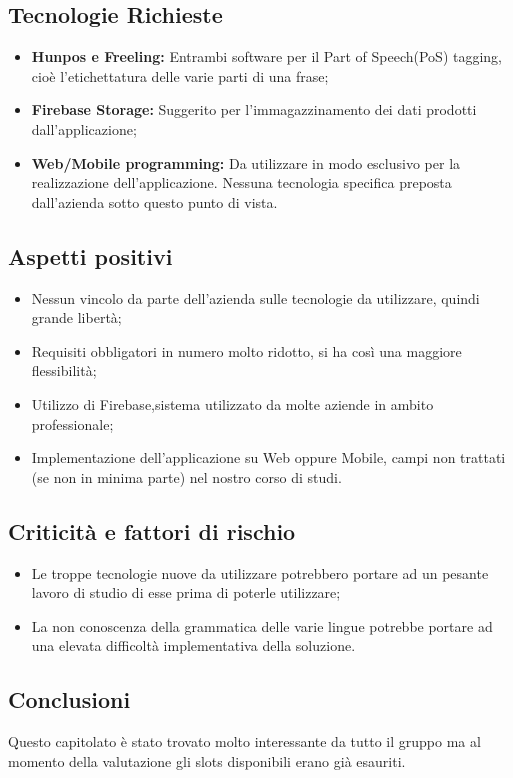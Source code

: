 \subsection{Tecnologie Richieste}
\begin{itemize}
	\item \textbf{Hunpos e Freeling: } Entrambi software per il Part of Speech(PoS) tagging, cioè l'etichettatura delle varie parti di una frase;
	\item \textbf{Firebase Storage: }Suggerito per l'immagazzinamento dei dati prodotti dall'applicazione;
	\item \textbf{Web/Mobile programming: }Da utilizzare in modo esclusivo per la realizzazione dell'applicazione. Nessuna tecnologia specifica preposta dall'azienda sotto questo punto di vista.
\end{itemize}
\subsection{Aspetti positivi}
\begin{itemize}
	\item Nessun vincolo da parte dell'azienda sulle tecnologie da utilizzare, quindi grande libertà;
	\item Requisiti obbligatori in numero molto ridotto, si ha così una maggiore flessibilità;
	\item Utilizzo di Firebase,sistema utilizzato da molte aziende in ambito professionale;
	\item Implementazione dell'applicazione su Web oppure Mobile, campi non trattati (se non in minima parte) nel nostro corso di studi. 
\end{itemize}
\subsection{Criticità e fattori di rischio}
\begin{itemize}
\item Le troppe tecnologie nuove da utilizzare potrebbero portare ad un pesante lavoro di studio di esse prima di poterle utilizzare;
\item La non conoscenza della grammatica delle varie lingue potrebbe portare ad una elevata difficoltà implementativa della soluzione.
\end{itemize}
\subsection{Conclusioni}
Questo capitolato è stato trovato molto interessante da tutto il gruppo ma al momento della valutazione gli slots disponibili erano già esauriti.